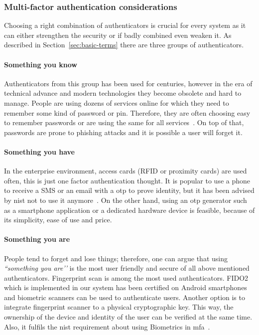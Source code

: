 \subsubsection*{Multi-factor authentication considerations} \label{multiFA}
Choosing a right combination of authenticators is crucial for every system as it can either strengthen the security or if badly combined even weaken it. As described in Section~\ref{sec:basic-terms} there are three groups of authenticators.

\paragraph{Something you know}
Authenticators from this group has been used for centuries, however in the era of technical advance and modern technologies they become obsolete and hard to manage. People are using dozens of services online for which they need to remember some kind of password or \acrshort{pin}. Therefore, they are often choosing easy to remember passwords or are using the same for all services~\cite{2018OnlineSurvey}. On top of that, passwords are prone to phishing attacks and it is possible a user will forget it. 

\paragraph{Something you have}
In the enterprise environment, access cards (RFID or proximity cards) are used often, this is just one factor authentication thought. It is popular to use a phone to receive a SMS or an email with a \acrfull{otp} to prove identity, but it has been advised by \acrshort{nist} not to use it anymore~\cite{NIST2017NISTBlog}. On the other hand, using an \acrshort{otp} generator such as a smartphone application or a dedicated hardware device is feasible, because of its simplicity, ease of use and price.

\paragraph{Something you are}
People tend to forget and lose things; therefore, one can argue that using \textit{``something you are’’} is the most user friendly and secure of all above mentioned authenticators. Fingerprint scan is among the most used authenticators. FIDO2 which is implemented in our system has been certified on Android smartphones and biometric scanners can be used to authenticate users. Another option is to integrate fingerprint scanner to a physical cryptographic key. This way, the ownership of the device and identity of the user can be verified at the same time. Also, it fulfils the \acrshort{nist} requirement about using Biometrics in \acrshort{mfa}~\cite{Grassi2017DigitalManagement}. 

